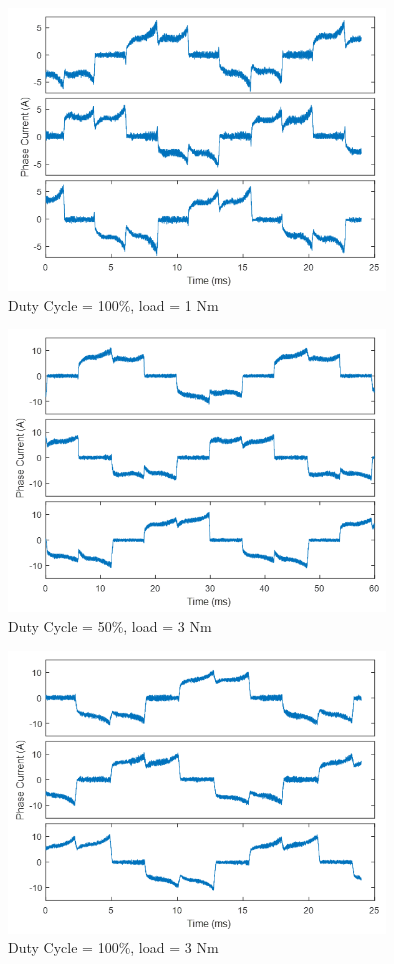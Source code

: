 \begin{figure}[h!p]
\centering
\includegraphics[width=10cm]{Images/waveforms/trap_curr_6.png} 
\caption[trapc6]{Duty Cycle = 100\%, load = 1 Nm}
\label{fig:trapc6}
\end{figure}

\begin{figure}[h!p]
\centering
\includegraphics[width=10cm]{Images/waveforms/trap_curr_7.png} 
\caption[trapc7]{Duty Cycle = 50\%, load = 3 Nm}
\label{fig:trapc7}
\end{figure}

\begin{figure}[h!p]
\centering
\includegraphics[width=10cm]{Images/waveforms/trap_curr_8.png} 
\caption[trapc8]{Duty Cycle = 100\%, load = 3 Nm}
\label{fig:trapc8}
\end{figure}

